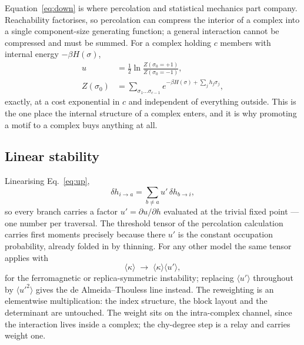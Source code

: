 \documentclass[aps,pre,twocolumn,superscriptaddress,floatfix]{revtex4-2}
\newcommand{\ave}[1]{\langle #1 \rangle}
\begin{document}
Equation~\eqref{eq:down} is where percolation and statistical mechanics part
company. Reachability factorises, so percolation can compress the interior of a
complex into a single component-size generating function; a general interaction
cannot be compressed and must be summed. For a complex holding $c$ members with
internal energy $-\beta H(\sigma)$,
\begin{equation}
  \begin{split}
    u&=\tfrac12\ln\frac{Z(\sigma_0=+1)}{Z(\sigma_0=-1)},\\
    Z(\sigma_0)&=\!\!\sum_{\sigma_1\dots\sigma_{c-1}}\!\!
      e^{-\beta H(\sigma)+\sum_j h_j\sigma_j},
  \end{split}
  \label{eq:emitted}
\end{equation}
exactly, at a cost exponential in $c$ and independent of everything outside.
This is the one place the internal structure of a complex enters, and it is why
promoting a motif to a complex buys anything at all.

\subsection{Linear stability}
\label{sec:stability}

Linearising Eq.~\eqref{eq:up},
\begin{equation}
  \delta h_{i\to a}=\sum_{b\neq a}u'\,\delta h_{b\to i},
  \label{eq:linear}
\end{equation}
so every branch carries a factor $u'=\partial u/\partial h$ evaluated at the
trivial fixed point --- one number per traversal. The threshold tensor of the
percolation calculation \cite{vazquez2023pre} carries first moments precisely
because there $u'$ is the constant occupation probability, already folded in by
thinning. For any other model the same tensor applies with
\begin{equation}
  \ave{\kappa}\;\longrightarrow\;\ave{\kappa}\ave{u'},
  \label{eq:reweight}
\end{equation}
for the ferromagnetic or replica-symmetric instability; replacing $\ave{u'}$
throughout by $\ave{u'^2}$ gives the de Almeida--Thouless line instead. The reweighting is an elementwise
multiplication: the index structure, the block layout and the determinant are
untouched. The weight sits on the intra-complex channel, since the interaction
lives inside a complex; the chy-degree step is a relay and carries weight one.
\end{document}
